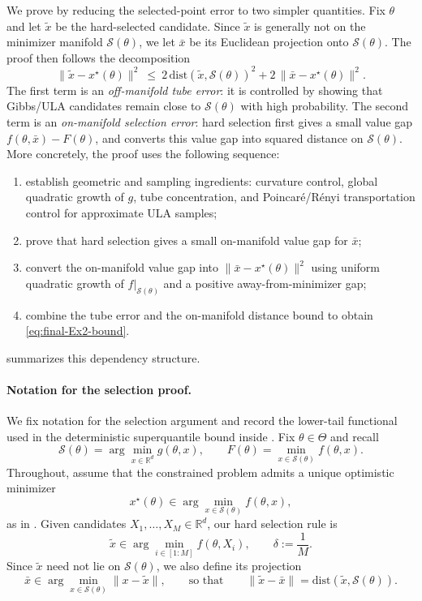 \documentclass{article}
\theoremstyle{normaltheorem}
\newcommand{\R}{\mathbb{R}}
\newcommand{\calS}{\mathcal{S}}
\begin{document}
We prove  by reducing the selected-point error to two simpler quantities.
Fix \(\theta\) and let \(\tilde x\) be the hard-selected candidate. Since \(\tilde x\) is generally not on the minimizer
manifold \(\calS(\theta)\), we let \(\bar x\) be its Euclidean projection onto \(\calS(\theta)\). The proof then follows the
decomposition
\[
\|\tilde x-x^\star(\theta)\|^2
\ \le\
2\,\mathrm{dist}(\tilde x,\calS(\theta))^2
+2\,\|\bar x-x^\star(\theta)\|^2 .
\]
	The first term is an \emph{off-manifold tube error}: it is controlled by showing that Gibbs/ULA candidates remain close to
	\(\calS(\theta)\) with high probability. The second term is an \emph{on-manifold selection error}: hard selection first gives
	a small value gap \(f(\theta,\bar x)-F(\theta)\), and \Cref{prop:uniform-riem-nondeg} converts this value gap
	into squared distance on \(\calS(\theta)\). More concretely, the proof uses the following sequence:
\begin{enumerate}[leftmargin=*]
\item establish geometric and sampling ingredients: curvature control, global quadratic growth of \(g\), tube concentration,
and Poincar\'e/R\'enyi transportation control for approximate ULA samples;
\item prove that hard selection gives a small on-manifold value gap for \(\bar x\);
\item convert the on-manifold value gap into \(\|\bar x-x^\star(\theta)\|^2\) using uniform quadratic growth of
\(f|_{\calS(\theta)}\) and a positive away-from-minimizer gap;
\item combine the tube error and the on-manifold distance bound to obtain \eqref{eq:final-Ex2-bound}.
\end{enumerate}
 summarizes this dependency structure.

\begin{figure}[omitted: a diagram of this paper's results, not reproduced here]\label{fig:appendix-d-selection-flow}\end{figure}
\paragraph{Notation for the selection proof.}
We fix notation for the selection argument and record the lower-tail functional used in the deterministic superquantile bound inside .
Fix $\theta\in\Theta$ and recall
\[
\calS(\theta)=\arg\min_{x\in\R^d} g(\theta,x),\qquad
F(\theta)=\min_{x\in\calS(\theta)} f(\theta,x).
\]
Throughout, assume that the constrained problem admits a unique optimistic minimizer
\[
x^\star(\theta)\in\arg\min_{x\in\calS(\theta)} f(\theta,x),
\]
as in . Given candidates $X_1,\dots,X_M\in\R^d$, our hard selection rule is
\[
\tilde x \in \arg\min_{i\in[1:M]} f(\theta,X_i),
\qquad
\delta:=\frac1M.
\]
Since $\tilde x$ need not lie on $\calS(\theta)$, we also define its projection
\[
\bar x \in \arg\min_{x\in\calS(\theta)}\|x-\tilde x\|,
\qquad\text{so that}\qquad
\|\tilde x-\bar x\|=\mathrm{dist}(\tilde x,\calS(\theta)).
\]
\end{document}
